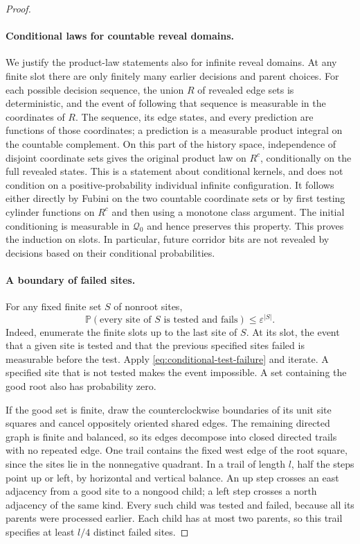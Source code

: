 \documentclass[11pt]{article}
\theoremstyle{definition}
\begin{document}
\begin{proof}
\paragraph{Conditional laws for countable reveal domains.}
We justify the product-law statements also for infinite reveal
domains. At any finite slot there are only finitely many earlier
decisions and parent choices. For each possible decision sequence,
the union $R$ of revealed edge sets is deterministic, and the event
of following that sequence is measurable in the coordinates of $R$.
The sequence, its edge states, and every prediction are functions
of those coordinates; a prediction is a measurable product integral
on the countable complement. On this part of the history space,
independence of disjoint coordinate sets gives the original product
law on $R^c$, conditionally on the full revealed states. This is a
statement about conditional kernels, and does not condition on a
positive-probability individual infinite configuration. It follows
either directly by Fubini on the two countable coordinate sets or by
first testing cylinder functions on $R^c$ and then using a monotone
class argument. The initial conditioning is measurable in
$\mathcal Q_0$ and hence preserves this property. This proves the
induction on slots. In particular, future corridor bits are not
revealed by decisions based on their conditional probabilities.

\paragraph{A boundary of failed sites.}
For any fixed finite set $S$ of nonroot sites,
\begin{equation}\label{eq:specified-failures}
 \mathbb P(\text{every site of }S\text{ is tested and fails})
       \le\varepsilon^{|S|}.
\end{equation}
Indeed, enumerate the finite slots up to the last site of $S$.
At its slot, the event that a given site is tested and that the
previous specified sites failed is measurable before the test.
Apply \eqref{eq:conditional-test-failure} and iterate. A specified
site that is not tested makes the event impossible. A set containing
the good root also has probability zero.

If the good set is finite, draw the counterclockwise boundaries of
its unit site squares and cancel oppositely oriented shared edges.
The remaining directed graph is finite and balanced, so its edges
decompose into closed directed trails with no repeated edge. One
trail contains the fixed west edge of the root square, since the
sites lie in the nonnegative quadrant. In a trail of length $l$,
half the steps point up or left, by horizontal and vertical balance.
An up step crosses an east adjacency from a good site to a nongood
child; a left step crosses a north adjacency of the same kind.
Every such child was tested and failed, because all its parents were
processed earlier. Each child has at most two parents, so this trail
specifies at least $l/4$ distinct failed sites.


\end{proof}
\end{document}
